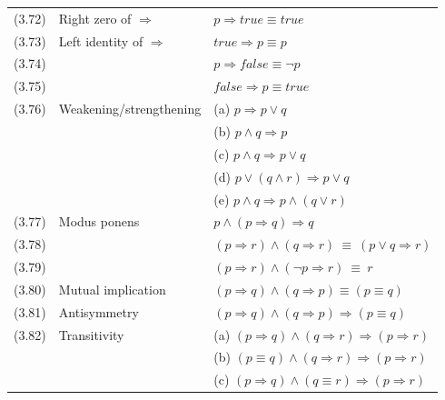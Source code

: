 \documentclass[letterpaper, 8pt]{extarticle}
\newcommand{\To}{\Rightarrow}
\begin{document}
\begin{multicols*}{3}
\begin{tabular}{@{}lll@{}}
        (3.72) & Right zero of $\To$                   & $p \To \textit{true} \equiv \textit{true}$              \\
        (3.73) & Left identity of $\To$                & $\textit{true} \To p \equiv p$                          \\
        (3.74) &                                       & $p \To \textit{false} \equiv \neg p$                    \\
        (3.75) &                                       & $\textit{false} \To p \equiv true$                      \\
        (3.76) & Weakening/strengthening               & (a) $p \To p \lor q$                                    \\
               &                                       & (b) $p \land q \To p$                                   \\
               &                                       & (c) $p \land q \To p \lor q$                            \\
               &                                       & (d) $p \lor (q \land r) \To p \lor q$                   \\
               &                                       & (e) $p \land q \To p \land (q \lor r)$                  \\
        (3.77) & Modus ponens                          & $p \land (p \To q) \To q$                               \\
        (3.78) &                                       & $(p \To r) \land (q \To r) \ \equiv \ (p \lor q \To r)$ \\
        (3.79) &                                       & $(p \To r) \land (\neg p \To r) \ \equiv \ r$           \\
        (3.80) & Mutual implication                    & $(p \To q) \land (q \To p) \equiv (p \equiv q)$         \\
        (3.81) & Antisymmetry                          & $(p \To q) \land (q \To p) \To (p \equiv q)$            \\
        (3.82) & Transitivity                          & (a) $(p \To q) \land (q \To r) \To (p \To r)$           \\
               &                                       & (b) $(p \equiv q) \land (q \To r) \To (p \To r)$        \\
               &                                       & (c) $(p \To q) \land (q \equiv r) \To (p \To r)$        \\
    \end{tabular}


\end{multicols*}
\end{document}
